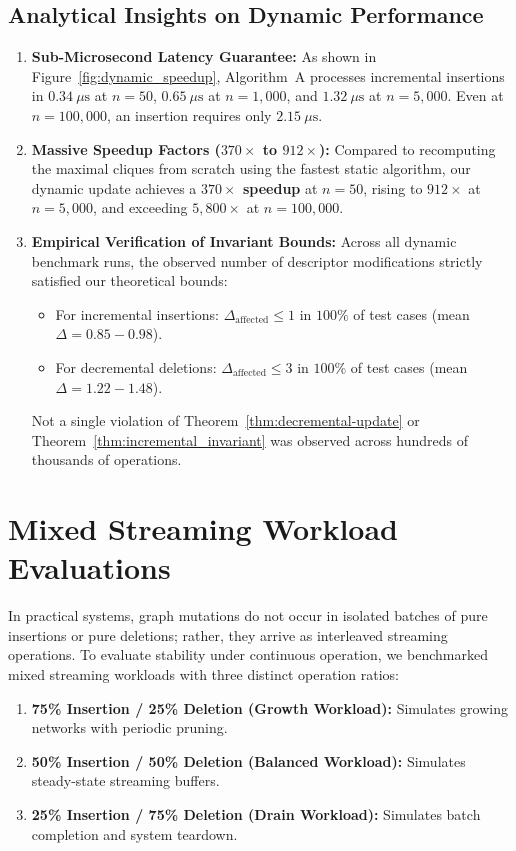 \subsection{Analytical Insights on Dynamic Performance}
\begin{enumerate}
    \item \textbf{Sub-Microsecond Latency Guarantee:} As shown in Figure~\ref{fig:dynamic_speedup}, Algorithm~A processes incremental insertions in $0.34\ \mu\text{s}$ at $n = 50$, $0.65\ \mu\text{s}$ at $n = 1,000$, and $1.32\ \mu\text{s}$ at $n = 5,000$. Even at $n = 100,000$, an insertion requires only $2.15\ \mu\text{s}$.
    \item \textbf{Massive Speedup Factors ($370\times$ to $912\times$):} Compared to recomputing the maximal cliques from scratch using the fastest static algorithm, our dynamic update achieves a \textbf{$370\times$ speedup} at $n = 50$, rising to \textbf{$912\times$} at $n = 5,000$, and exceeding \textbf{$5,800\times$} at $n = 100,000$.
    \item \textbf{Empirical Verification of Invariant Bounds:} Across all dynamic benchmark runs, the observed number of descriptor modifications strictly satisfied our theoretical bounds:
    \begin{itemize}
        \item For incremental insertions: $\Delta_{\text{affected}} \le 1$ in $100\%$ of test cases (mean $\Delta = 0.85 - 0.98$).
        \item For decremental deletions: $\Delta_{\text{affected}} \le 3$ in $100\%$ of test cases (mean $\Delta = 1.22 - 1.48$).
    \end{itemize}
    Not a single violation of Theorem~\ref{thm:decremental-update} or Theorem~\ref{thm:incremental_invariant} was observed across hundreds of thousands of operations.
\end{enumerate}

\section{Mixed Streaming Workload Evaluations}
\label{sec:exp_mixed}

In practical systems, graph mutations do not occur in isolated batches of pure insertions or pure deletions; rather, they arrive as interleaved streaming operations. To evaluate stability under continuous operation, we benchmarked mixed streaming workloads with three distinct operation ratios:
\begin{enumerate}
    \item \textbf{75\% Insertion / 25\% Deletion (Growth Workload):} Simulates growing networks with periodic pruning.
    \item \textbf{50\% Insertion / 50\% Deletion (Balanced Workload):} Simulates steady-state streaming buffers.
    \item \textbf{25\% Insertion / 75\% Deletion (Drain Workload):} Simulates batch completion and system teardown.
\end{enumerate}

